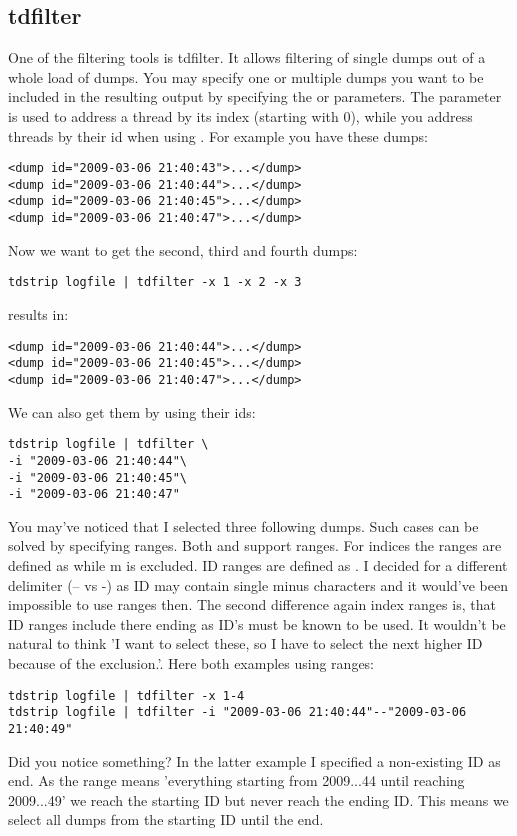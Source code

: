 \subsection{tdfilter}

One of the filtering tools is tdfilter. 
It allows filtering of single dumps out of a whole load of dumps.
You may specify one or multiple dumps you want to be included in the resulting output by specifying the  or  parameters.
The  parameter is used to address a thread by its index (starting with 0), while you address threads by their id when using .
For example you have these dumps:
\begin{lstlisting}
<dump id="2009-03-06 21:40:43">...</dump>
<dump id="2009-03-06 21:40:44">...</dump>
<dump id="2009-03-06 21:40:45">...</dump>
<dump id="2009-03-06 21:40:47">...</dump>
\end{lstlisting}

Now we want to get the second, third and fourth dumps:
\begin{lstlisting}
tdstrip logfile | tdfilter -x 1 -x 2 -x 3
\end{lstlisting}

results in:
\begin{lstlisting}
<dump id="2009-03-06 21:40:44">...</dump>
<dump id="2009-03-06 21:40:45">...</dump>
<dump id="2009-03-06 21:40:47">...</dump>
\end{lstlisting}

We can also get them by using their ids:
\begin{lstlisting}
tdstrip logfile | tdfilter \
-i "2009-03-06 21:40:44"\
-i "2009-03-06 21:40:45"\
-i "2009-03-06 21:40:47"
\end{lstlisting}

You may've noticed that I selected three following dumps.
Such cases can be solved by specifying ranges.
Both  and  support ranges.
For indices the ranges are defined as \inlineCode{-x n-m} while m is
excluded.
ID ranges are defined as \inlineCode{-i n--m}.
I decided for a different delimiter (-- vs -) as ID may contain single minus characters
and it would've been impossible to use ranges then.
The second difference again index ranges is, that ID ranges include there
ending as ID's must be known to be used.
It wouldn't be natural to think 'I want to select these, so I have to select 
the next higher ID because of the exclusion.'.
Here both examples using ranges:
\begin{lstlisting}
tdstrip logfile | tdfilter -x 1-4
tdstrip logfile | tdfilter -i "2009-03-06 21:40:44"--"2009-03-06 21:40:49"
\end{lstlisting}

Did you notice something?
In the latter example I specified a non-existing ID as end.
As the range means 'everything starting from 2009...44 until reaching 2009...49'
we reach the starting ID but never reach the ending ID.
This means we select all dumps from the starting ID until the end.
